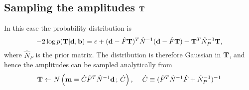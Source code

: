 \documentclass[a4paper,10pt]{article}
\begin{document}
\subsection{Sampling the amplitudes ${\bf T}$}
In this case the probability distribution is 
\begin{equation}
 -2\log p({\bf T}|{\bf d},{\bf b})=c+({\bf d}-\hat{F}{\bf T})^T\hat{N}^{-1}({\bf d}-\hat{F}{\bf T})+{\bf T}^T\hat{N}_P^{-1}{\bf T},
\end{equation}
where $\hat{N}_P$ is the prior matrix. The distribution is therefore Gaussian in ${\bf T}$, and hence the amplitudes can be sampled analytically from
\begin{equation}
 {\bf T}\leftarrow N\left({\bf m}=\hat{C}\hat{F}^T\hat{N}^{-1}{\bf d}\,;\,\hat{C}\right),
 \hspace{12pt}\hat{C}\equiv(\hat{F}^T\hat{N}^{-1}\hat{F}+\hat{N}_P^{-1})^{-1}
\end{equation}
\end{document}
